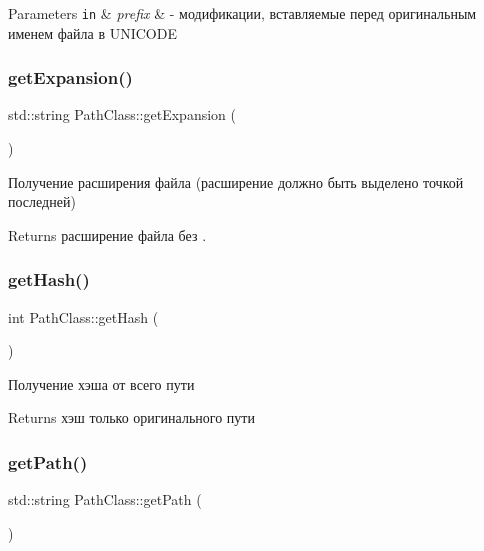 \begin{DoxyParams}[1]{Parameters}
\mbox{\tt in}  & {\em prefix} & -\/ модификации, вставляемые перед оригинальным именем файла в U\+N\+I\+C\+O\+DE \\
\hline
\end{DoxyParams}
\mbox{\label{class_path_class_a4a5fc3904f0d147a0dbab055c0b9c143}} 
\subsubsection{\texorpdfstring{get\+Expansion()}{getExpansion()}}
{\footnotesize\ttfamily std\+::string Path\+Class\+::get\+Expansion (\begin{DoxyParamCaption}{ }\end{DoxyParamCaption})}



Получение расширения файла (расширение должно быть выделено точкой последней) 

\begin{DoxyReturn}{Returns}
расширение файла без \textquotesingle{}.\textquotesingle{} 
\end{DoxyReturn}
\mbox{\label{class_path_class_aba7fd7fbc4fd3d093a91c9d57590887b}} 
\subsubsection{\texorpdfstring{get\+Hash()}{getHash()}}
{\footnotesize\ttfamily int Path\+Class\+::get\+Hash (\begin{DoxyParamCaption}{ }\end{DoxyParamCaption})}



Получение хэша от всего пути 

\begin{DoxyReturn}{Returns}
хэш только оригинального пути 
\end{DoxyReturn}
\mbox{\label{class_path_class_a4f6e38c297fca1b064e38d03b7876024}} 
\subsubsection{\texorpdfstring{get\+Path()}{getPath()}}
{\footnotesize\ttfamily std\+::string Path\+Class\+::get\+Path (\begin{DoxyParamCaption}{ }\end{DoxyParamCaption})}



